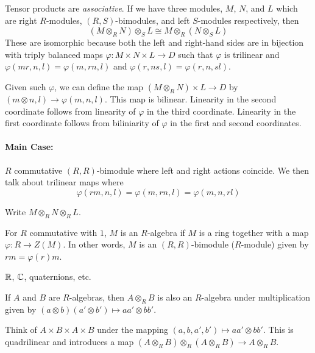 \documentclass[a4paper,twoside,master.tex]{subfiles}
\begin{document}

Tensor products are \textit{associative}. If we have three modules, $ M $, $ N $, and $ L $ which are right $ R $-modules, $ (R,S) $-bimodules, and left $ S $-modules respectively, then
\begin{equation}
    (M \otimes_R N) \otimes_S L \cong M \otimes_R (N \otimes_S L)
\end{equation}
These are isomorphic because both the left and right-hand sides are in bijection with triply balanced maps $ \varphi \colon M \times N \times L \to D $ such that $ \varphi $ is trilinear and $ \varphi(mr,n,l) = \varphi(m,rn,l) $ and $ \varphi(r,ns,l) = \varphi(r,n,sl) $.

Given such $\varphi$, we can define the map $ (M \otimes_R N) \times L \to D $ by $ (m \otimes n, l) \to \varphi(m,n,l) $. This map is bilinear. Linearity in the second coordinate follows from linearity of $ \varphi $ in the third coordinate. Linearity in the first coordinate follows from biliniarity of $ \varphi $ in the first and second coordinates.

\paragraph{Main Case:} $ R $ commutative $ (R,R) $-bimodule where left and right actions coincide. We then talk about trilinear maps where
\begin{equation}
    \varphi(rm,n,l) = \varphi(m,rn,l) = \varphi(m,n,rl)
\end{equation}

Write $ M \otimes_R N \otimes_R L $.
\begin{definition}
    For $ R $ commutative with $ 1 $, $ M $ is an $ R $-algebra if $ M $ is a ring together with a map $ \varphi \colon R \to Z(M) $. In other words, $ M $ is an $ (R,R) $-bimodule ($ R $-module) given by $ rm = \varphi(r) m $.
\end{definition}

\begin{ex}
    $ \mathbb{R} $, $ \mathbb{C} $, quaternions, etc.
\end{ex}
If $ A $ and $ B $ are $ R $-algebras, then $ A \otimes_R B $ is also an $ R $-algebra under multiplication given by $ (a \otimes b)(a' \otimes b')\mapsto aa' \otimes bb' $.

Think of $ A \times B \times A \times B $ under the mapping $ (a,b,a',b')\mapsto aa' \otimes bb' $. This is quadrilinear and introduces a map $ (A \otimes_R B) \otimes_R (A \otimes_R B) \to A \otimes_R B $.
\end{document}
